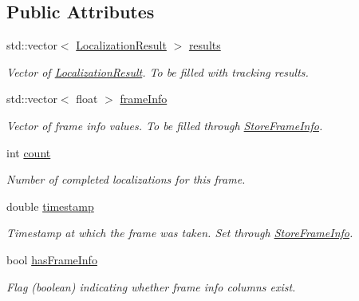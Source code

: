 \subsection*{Public Attributes}
\begin{DoxyCompactItemize}
\item 
std\+::vector$<$ \hyperlink{struct_localization_result}{Localization\+Result} $>$ \hyperlink{struct_result_manager_1_1_frame_result_a090e9b69a382702cb7d551566d3bee76}{results}
\begin{DoxyCompactList}\small\item\em Vector of \hyperlink{struct_localization_result}{Localization\+Result}. To be filled with tracking results. \end{DoxyCompactList}\item 
std\+::vector$<$ float $>$ \hyperlink{struct_result_manager_1_1_frame_result_a8ad3ac9ceb60b928bffae4e978b87eb0}{frame\+Info}
\begin{DoxyCompactList}\small\item\em Vector of frame info values. To be filled through \hyperlink{class_result_manager_a0bbedc935395c1af29f175f81ab063c9}{Store\+Frame\+Info}. \end{DoxyCompactList}\item 
int \hyperlink{struct_result_manager_1_1_frame_result_a0f8a4a4c5ba0eb70faa74b2074d1d7d1}{count}
\begin{DoxyCompactList}\small\item\em Number of completed localizations for this frame. \end{DoxyCompactList}\item 
double \hyperlink{struct_result_manager_1_1_frame_result_a6ed8062b8120c1bb853f6d14d8b904e7}{timestamp}
\begin{DoxyCompactList}\small\item\em Timestamp at which the frame was taken. Set through \hyperlink{class_result_manager_a0bbedc935395c1af29f175f81ab063c9}{Store\+Frame\+Info}. \end{DoxyCompactList}\item 
bool \hyperlink{struct_result_manager_1_1_frame_result_ac2f96ff6a7017bd7dd4a6e9ab14dbd0b}{has\+Frame\+Info}
\begin{DoxyCompactList}\small\item\em Flag (boolean) indicating whether frame info columns exist. \end{DoxyCompactList}\end{DoxyCompactItemize}


